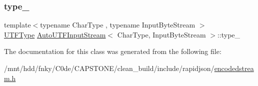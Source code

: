 \subsubsection{\texorpdfstring{type\+\_\+}{type\_}}
{\footnotesize\ttfamily template$<$typename Char\+Type , typename Input\+Byte\+Stream $>$ \\
\hyperlink{encodings_8h_ac9448aedf514a5bb509bae73a9ce4e58}{U\+T\+F\+Type} \hyperlink{classAutoUTFInputStream}{Auto\+U\+T\+F\+Input\+Stream}$<$ Char\+Type, Input\+Byte\+Stream $>$\+::type\+\_\+\hspace{0.3cm}{\ttfamily [private]}}



The documentation for this class was generated from the following file\+:\begin{DoxyCompactItemize}
\item 
/mnt/hdd/fnky/\+C0de/\+C\+A\+P\+S\+T\+O\+N\+E/clean\+\_\+build/include/rapidjson/\hyperlink{encodedstream_8h}{encodedstream.\+h}\end{DoxyCompactItemize}

